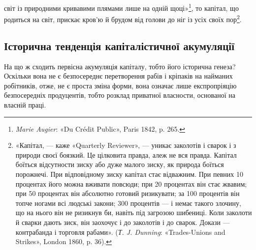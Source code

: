 світ із природними кривавими плямами лише на одній щоці»\footnote{
\emph{Marie Augier}: «Du Crédit Public», Paris 1842, p. 265.
},
то капітал, що родиться на світ, прискає кров’ю й брудом від
голови до ніг із усіх своїх пор\footnote{
«Капітал, — каже «Quarterly Reviewer», — уникає заколотів
і сварок і з природи своєї боязкий. Це цілковита правда, алеж не вся
правда. Капітал боїться відсутности зиску або дуже малого зиску, як
природа боїться порожнечі. При відповідному зиску капітал стає відважним.
При певних 10 процентах його можна вживати повсюди; при 20 процентах
він стає жвавим; при 50 процентах він абсолютно готовий ризикувати;
за 100 процентів він топче ногами всі людські закони; 300 процентів
— і немає такого злочину, що на нього він не ризикнув би, навіть
під загрозою шибениці. Коли заколоти й сварки дають зиск, він заохочує
і до заколотів і до сварок. Докази — контрабанда і торговля рабами».
(\emph{Т. J. Dunning}: «Trades-Unions and Strikes», London 1860, p. 36).
}.

\subsection{Історична тенденція капіталістичної акумуляції}

На що ж сходить первісна акумуляція капіталу, тобто його
історична генеза? Оскільки вона не є безпосереднє перетворення
рабів і кріпаків на найманих робітників, отже, не є проста
зміна форми, вона означає лише експропріяцію безпосередніх
продуцентів, тобто розклад приватної власности, основаної на
власній праці.
